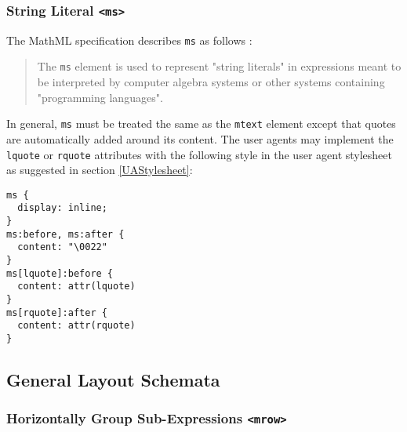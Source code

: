 \subsubsection{String Literal {\tt <ms>}}

The MathML specification describes {\tt ms} as follows \cite{MathML3}:
%
\begin{quote}
The {\tt ms} element is used to represent "string literals" in expressions
meant to be interpreted by computer algebra systems or other systems containing
"programming languages".
\end{quote}

In general, {\tt ms} must be treated the same as the {\tt mtext}
element except that quotes are automatically added around its content.
The user agents may implement the {\tt lquote} or {\tt rquote} attributes
with the following style in the user agent stylesheet as suggested in section
\ref{UAStylesheet}:

\begin{lstlisting}
ms {
  display: inline;
}
ms:before, ms:after {
  content: "\0022"
}
ms[lquote]:before {
  content: attr(lquote)
}
ms[rquote]:after {
  content: attr(rquote)
}
\end{lstlisting}

\subsection{General Layout Schemata}

\subsubsection{Horizontally Group Sub-Expressions {\tt <mrow>}}\label{Mrow}

